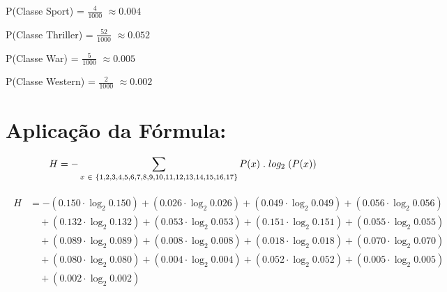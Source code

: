 \documentclass{article}
\begin{document}
P(Classe Sport) = $\frac{4}{1000}$ $\approx 0.004$

P(Classe Thriller) = $\frac{52}{1000}$ $\approx 0.052$

P(Classe War) = $\frac{5}{1000}$ $\approx 0.005$

P(Classe Western) = $\frac{2}{1000}$ $\approx 0.002$

\section{Aplicação da Fórmula:\newline}

\begin{align*}
    \ H = - \sum_{x  \hspace{0.1cm} \in  \hspace{0.1cm} \{1, 2, 3, 4, 5, 6, 7, 8, 9, 10, 11, 12, 13, 14, 15, 16, 17\}} P(x)\hspace{0.1cm} . \hspace{0.1cm} log_2 \hspace{0.1cm} (P(x))\newline
\end{align*}

\begin{align*}
    \begin{split}
        H &= - (0.150 \cdot \log_2 0.150) + (0.026 \cdot \log_2 0.026) + (0.049 \cdot \log_2 0.049) + (0.056 \cdot \log_2 0.056) \\
        &\quad + (0.132 \cdot \log_2 0.132) + (0.053 \cdot \log_2 0.053) + (0.151 \cdot \log_2 0.151) + (0.055 \cdot \log_2 0.055) \\
        &\quad + (0.089 \cdot \log_2 0.089) + (0.008 \cdot \log_2 0.008) + (0.018 \cdot \log_2 0.018) + (0.070 \cdot \log_2 0.070) \\
        &\quad + (0.080 \cdot \log_2 0.080) + (0.004 \cdot \log_2 0.004) + (0.052 \cdot \log_2 0.052) + (0.005 \cdot \log_2 0.005) \\
        &\quad + (0.002 \cdot \log_2 0.002)
    \end{split}
\end{align*}
\end{document}

